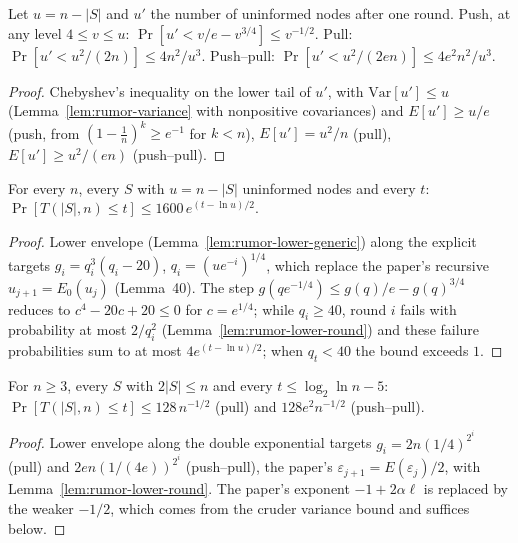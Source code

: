 \begin{lemma}\label{lem:rumor-lower-round}
\leanok{}
Let $u=n-|S|$ and $u'$ the number of uninformed nodes after one round. Push, at any level
$4\le v\le u$: $\Pr[u'<v/e-v^{3/4}]\le v^{-1/2}$. Pull: $\Pr[u'<u^2/(2n)]\le4n^2/u^3$.
Push--pull: $\Pr[u'<u^2/(2en)]\le4e^2n^2/u^3$.
\end{lemma}
\begin{proof}\leanok
Chebyshev's inequality on the lower tail of $u'$, with $\mathrm{Var}[u']\le u$
(Lemma~\ref{lem:rumor-variance} with nonpositive covariances) and $E[u']\ge u/e$ (push, from
$(1-\frac1n)^k\ge e^{-1}$ for $k<n$), $E[u']=u^2/n$ (pull), $E[u']\ge u^2/(en)$ (push--pull).
\end{proof}

\begin{theorem}\label{thm:rumor-lower-final-push}
\leanok{}
For every $n$, every $S$ with $u=n-|S|$ uninformed nodes and every $t$:
$\Pr[T(|S|,n)\le t]\le1600\,e^{(t-\ln u)/2}$.
\end{theorem}
\begin{proof}\leanok
Lower envelope (Lemma~\ref{lem:rumor-lower-generic}) along the explicit targets
$g_i=q_i^3(q_i-20)$, $q_i=(ue^{-i})^{1/4}$, which replace the paper's recursive $u_{j+1}=E_0(u_j)$
(Lemma~40). The step $g(qe^{-1/4})\le g(q)/e-g(q)^{3/4}$ reduces to $c^4-20c+20\le0$ for
$c=e^{1/4}$; while $q_i\ge40$, round $i$ fails with probability at most $2/q_i^2$
(Lemma~\ref{lem:rumor-lower-round}) and these failure probabilities sum to at most
$4e^{(t-\ln u)/2}$; when $q_t<40$ the bound exceeds $1$.
\end{proof}

\begin{theorem}[Final phase of pull and push--pull; Theorem 48 with $\ell=2$]\label{thm:rumor-lower-final-double}
\leanok{}
For $n\ge3$, every $S$ with $2|S|\le n$ and every $t\le\log_2\ln n-5$:
$\Pr[T(|S|,n)\le t]\le128\,n^{-1/2}$ (pull) and $128e^2n^{-1/2}$ (push--pull).
\end{theorem}
\begin{proof}\leanok
Lower envelope along the double exponential targets $g_i=2n(1/4)^{2^i}$ (pull) and
$2en(1/(4e))^{2^i}$ (push--pull), the paper's $\varepsilon_{j+1}=E(\varepsilon_j)/2$, with
Lemma~\ref{lem:rumor-lower-round}. The paper's exponent $-1+2\alpha\ell$ is replaced by the weaker
$-1/2$, which comes from the cruder variance bound and suffices below.
\end{proof}

